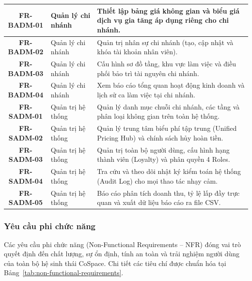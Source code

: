 \begin{table}[H]
\begin{tabular}{|c|l|p{7.5cm}|}
\hline
\textbf{FR-BADM-01} & Quản lý chi nhánh & Thiết lập bảng giá không gian và biểu giá dịch vụ gia tăng áp dụng riêng cho chi nhánh. \\
\hline
\textbf{FR-BADM-02} & Quản lý chi nhánh & Quản trị nhân sự chi nhánh (tạo, cập nhật và khóa tài khoản nhân viên). \\
\hline
\textbf{FR-BADM-03} & Quản lý chi nhánh & Cấu hình sơ đồ tầng, khu vực làm việc và điều phối bảo trì tài nguyên chi nhánh. \\
\hline
\textbf{FR-BADM-04} & Quản lý chi nhánh & Xem báo cáo tổng quan hoạt động kinh doanh và lịch sử ca làm việc tại chi nhánh. \\
\hline
\textbf{FR-SADM-01} & Quản trị hệ thống & Quản lý danh mục chuỗi chi nhánh, các tầng và phân loại không gian trên toàn hệ thống. \\
\hline
\textbf{FR-SADM-02} & Quản trị hệ thống & Quản lý trung tâm biểu phí tập trung (Unified Pricing Hub) và chính sách hủy hoàn tiền. \\
\hline
\textbf{FR-SADM-03} & Quản trị hệ thống & Quản trị toàn bộ người dùng, cấu hình hạng thành viên (Loyalty) và phân quyền 4 Roles. \\
\hline
\textbf{FR-SADM-04} & Quản trị hệ thống & Tra cứu và theo dõi nhật ký kiểm toán hệ thống (Audit Log) cho mọi thao tác nhạy cảm. \\
\hline
\textbf{FR-SADM-05} & Quản trị hệ thống & Báo cáo phân tích doanh thu, tỷ lệ lấp đầy trực quan và xuất dữ liệu báo cáo ra file CSV. \\
\hline
\end{tabular}
\end{table}

\subsubsection{Yêu cầu phi chức năng}

Các yêu cầu phi chức năng (Non-Functional Requirements -- NFR) đóng vai trò quyết định đến chất lượng, sự ổn định, tính an toàn và trải nghiệm người dùng của toàn bộ hệ sinh thái CoSpace. Chi tiết các tiêu chí được chuẩn hóa tại Bảng~\ref{tab:non-functional-requirements}.

